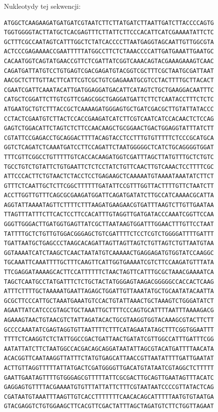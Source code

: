 \documentclass[a4paper]{article}
\begin{document}
Nukleotydy tej sekwencji:

\begin{verbatim}
ATGGCTCAAGAAGATGATGATCGTAATCTTCTTATGATCTTAATTGATCTTACCCCAGTG
TGGTGGGGTACTTATGCTCACGAGTTTCTTATTCTTCCCACATTCATCGAAAATATTCTC
GCTTTCGCCAATAGTCATTTGGCTCTATCACCCCTTAATGAGGTAGCAATTGTTGGCGTA
ACTCCCGAGAAAACCGAATTTTTATGGCCTTCTCTAAACCCCATTGATGAAATTGAATGC
CACAATGGTCAGTATGAACCGTTCTCGATTATCGGTCAAACAGTACGAAAGAAAGTCAAC
CAGATGATTATGTCCTGTGAGTCGACGAGATGTACGGTCGCTTTCGCTAATGCGATTAAT
AACGCTCTTTGTTACTTCATTCGTCGCTGTCGAGAAATGCGTCCTACTTTTGCTTACACT
CGAATCGATTCAAATACATTGATGGAGGATGACATTCATAGTCTGCTGAAGGACAATTTC
CATGCTCGGATTCTTGTCGTTCGAGCGGCTGAGGATGATTCTTCTCAATACCTTTCTCTC
ATGAATGCTGTCTTTACCGCTCAAAAGATGGGAGTGCTGATCGACGCTTGTATTATACCC
CCTACTCGAATGTCTTACTCCACCGAAGATCATCTTCGTCAATCATCCACAACTCTCCAG
GAGTCTGGACATTCTAGTCTCTTCCAACAAGCTGCGGAACTGACTGGAGGTATTTATCTT
CGTATTCCGAGACCTGCAGGACTTTTACAGTACCTCCTTTGTGTTTTTCTCCCGCATGCA
GGTCTCAGATCTCAAATGATCCTTCCAGATTCTAATGGGGGCTCATCTGCAGGGGTGGAT
TTTCGTTCGGCCTGTTTTTGTCACCACAAGATGGTCGATTTAGCTTATGTTTGCTCTGTC
TGCCTGTCTGTATTCTGTGAATTCTCTCCTATCTGTTCAACTTGTCAAACTCCTTTTCGC
ATTCCCACTTCTGTAACTCTACCTCCTGAGAAGCTCAAAAATGTAAAATAAATATCTTCT
GTTTCTCAATTGCTCTTCGGCTTTTTTGATATTCCGTTTGGTTACTTTTGTTCTAATCTT
ACCTTGGTTGTTTCAGCGCGAAGATGGATTCAGATGATATCTTGCCATCAAAACGCATTA
AGGTATTAAAATAGTTCTTTTCTTTAAGATGAAGAACGTGATTTAAGTCTTGTTGAATAA
TTAGTTTATTTCTTCACTCCTTCCACATTTGTAGGTTGATGATACCCAAATCGGTTCCAA
GGGTTGGGACTTGATGGTGAGTTATCGCTTAATAAGTGGATTTGGAACTTTGTTCCTAAT
TATTTTGCTCTGTTGTGGACGGGAGCTGTCGATTTTCTCCTCGTCTGGGGATTTTGATTT
TGATTAATGCTGAGCCCTAAGCACAGATTAGTTAGTTAGTCTGTTAGTCTGTTAATGTAA
GGTAAAATCATCTAAGCTCAACTAATATGTCAAAAACTGAGGAGATGTGGTATCCAAGGC
TGCAAATTCAAATTTTGCTTTCAAGTTCATTGGTGAAAATCGTCTTCCAAGATGTTTATA
TTCGAGGATAAAAGCACTTCCATTTTTTCTAACTAGTTCATTTGCGCTAAACGAAAATCA
TAGCTCAATGCCTATGATTTCTCTGCTACTATGGGAGTAAGACGGGGGCCACCACTCAAG
ATTTCTTTTGCTAAAAATGAATTAGAGCTGGATTGTTAAATATGCTGCAATATACAATTA
GCGCTTCCCATTGCTAAATGAAATGTCCACTGTATTAAACTGCTAAAGTCTGGGATATCT
AGAATTATCATCCCGTAGCTGCTAAATTGCTTTTCCCAGTGCATTTTAATTTAAAAGACG
AGAAAGTAACTGTAACGTCTATTAGATACACTGCGTAAGGTGGTACAAAGCGTACTTCTT
GCCCCAAATATCGAGTAGGTGTTAATTTTCTTTCATAGAATATAGCTTTCGGTGGAATTT
TTTTCTCAAGGTCTCTATTGGCCGACTGATTAACTGATATCGTTGGCCATTTGATTTCGG
AATATTATCTTCTAATGGCCACGACAGCAGGATAATATTAGCGTACATGATTTTAACATA
ACACGGTTCAATAAGGTTATTTCTATGTGAGCATTAACCGTTAATATTTTGATTGAATAT
ACTTGTTAGGTTTTTATTATGACTCGATGGGGTTGACATGTATAATCGTAGGCTCTTTTT
GAATTGAATAGTTTTGTGGGAGCGTTTTTATTCGCGACTTGCAGTTGAATAGTTTACATC
GAGGAGTGTTTTACGAAAATGTGTTTATTATTCTTTCGTAATAATCCCCGTTATACTCAG
CGATAATGTAAATTTAAGTTGTCACCTTTTTTTCAACACAGCATTTTTAATGTGTAATGA
GTACGAGGTCTGTGGAAGCTTCACGTTCGACTATTTAGCTAGATGTCTTCTGGTTAGAAT

\end{verbatim}
\end{document}
